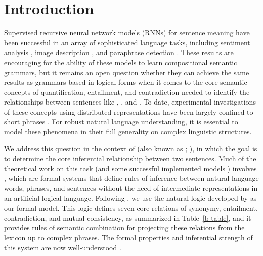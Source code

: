 \section{Introduction}\label{sec:intro}

Supervised recursive neural network models (RNNs) for sentence meaning
have been successful in an array of sophisticated language tasks,
including sentiment analysis \cite{socher2011semi,socher2013acl1},
image description \cite{sochergrounded}, and paraphrase detection
\cite{Socher-etal:2011:Paraphrase}. These results are encouraging for
the ability of these models to learn compositional semantic grammars,
but it remains an open question whether they can achieve the same
results as grammars based in logical forms
\cite{Warren:Pereira:1982,Zelle:Mooney:1996,ZetCol:2005,LiangJordan:2013}
when it comes to the core semantic concepts of quantification,
entailment, and contradiction needed to identify the relationships
between sentences like , , and . To date, experimental
investigations of these concepts using distributed representations
have been largely confined to short phrases
\cite{Mitchell:Lapata:2010,Grefenstette-etal:2011,baroni2012entailment,kalchbrenner2014convolutional}.
For robust natural language understanding, it is essential to model
these phenomena in their full generality on complex linguistic
structures.

We address this question in the context of  (also known as ;
\cite{dagan2006pascal}), in which the goal is to determine the core
inferential relationship between two sentences. Much of the
theoretical work on this task (and some successful implemented models
\cite{maccartney2009extended,watanabe2012latent}) involves , which are formal systems that define rules of inference
between natural language words, phrases, and sentences without the
need of intermediate representations in an artificial logical
language. Following \cite{bowman2013can}, we use the natural logic
developed by \cite{maccartney2009extended} as our formal model. This
logic defines seven core relations of synonymy, entailment,
contradiction, and mutual consistency, as summarized in
Table~\ref{b-table}, and it provides rules of semantic combination for
projecting these relations from the lexicon up to complex phrases. The
formal properties and inferential strength of this system are now
well-understood \cite{Icard:Moss:2013,Icard:Moss:2013:LILT}.

